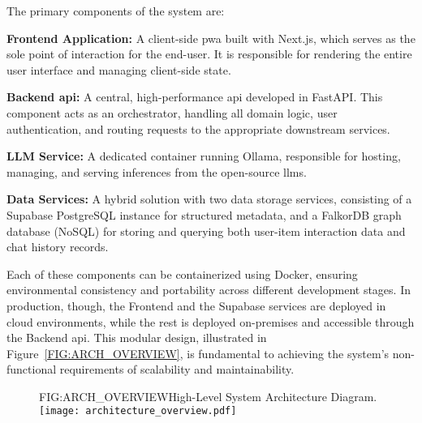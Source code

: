 The primary components of the system are:
\begin{compactitem}[\textbullet]
    \item \textbf{Frontend Application:} A client-side \ac{pwa} built with Next.js, which serves as the sole point of interaction for the end-user. It is responsible for rendering the entire user interface and managing client-side state.
    \item \textbf{Backend \acs{api}:} A central, high-performance \acs{api} developed in FastAPI. This component acts as an orchestrator, handling all domain logic, user authentication, and routing requests to the appropriate downstream services.
    \item \textbf{LLM Service:} A dedicated container running Ollama, responsible for hosting, managing, and serving inferences from the open-source \acp{llm}.
    \item \textbf{Data Services:} A hybrid solution with two data storage services, consisting of a Supabase \cite{SUPABASE} PostgreSQL instance for structured metadata, and a FalkorDB graph database (NoSQL) for storing and querying both user-item interaction data and chat history records.
\end{compactitem}

Each of these components can be containerized using Docker, ensuring environmental consistency and portability across different development stages. In production, though, the Frontend and the Supabase services are deployed in cloud environments, while the rest is deployed on-premises and accessible through the Backend \acs{api}. This modular design, illustrated in Figure~\ref{FIG:ARCH_OVERVIEW}, is fundamental to achieving the system's non-functional requirements of scalability and maintainability.

\begin{figure}[System Architecture Diagram]{FIG:ARCH_OVERVIEW}{High-Level System Architecture Diagram.}
    \texttt{[image: architecture\_overview.pdf]}
\end{figure}
